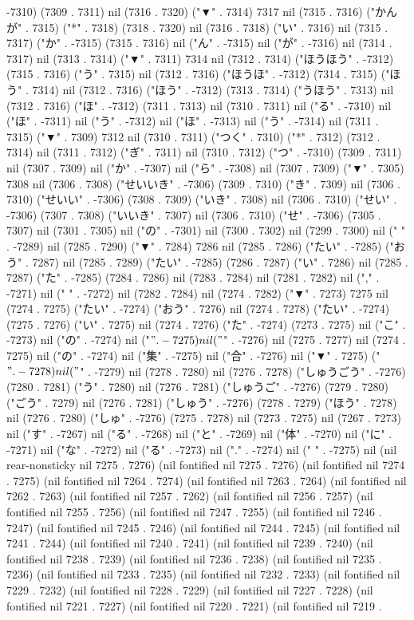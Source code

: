 -7310) (7309 . 7311) nil (7316 . 7320) ("▼" . 7314) 7317 nil (7315 . 7316) ("かんが" . 7315) ("*" . 7318) (7318 . 7320) nil (7316 . 7318) ("い" . 7316) nil (7315 . 7317) ("か" . -7315) (7315 . 7316) nil ("ん" . -7315) nil ("が" . -7316) nil (7314 . 7317) nil (7313 . 7314) ("▼" . 7311) 7314 nil (7312 . 7314) ("ほうほう" . -7312) (7315 . 7316) ("う" . 7315) nil (7312 . 7316) ("ほうほ" . -7312) (7314 . 7315) ("ほう" . 7314) nil (7312 . 7316) ("ほう" . -7312) (7313 . 7314) ("うほう" . 7313) nil (7312 . 7316) ("ほ" . -7312) (7311 . 7313) nil (7310 . 7311) nil ("る" . -7310) nil ("ほ" . -7311) nil ("う" . -7312) nil ("ほ" . -7313) nil ("う" . -7314) nil (7311 . 7315) ("▼" . 7309) 7312 nil (7310 . 7311) ("つく" . 7310) ("*" . 7312) (7312 . 7314) nil (7311 . 7312) ("ぎ" . 7311) nil (7310 . 7312) ("つ" . -7310) (7309 . 7311) nil (7307 . 7309) nil ("か" . -7307) nil ("ら" . -7308) nil (7307 . 7309) ("▼" . 7305) 7308 nil (7306 . 7308) ("せいいき" . -7306) (7309 . 7310) ("き" . 7309) nil (7306 . 7310) ("せいい" . -7306) (7308 . 7309) ("いき" . 7308) nil (7306 . 7310) ("せい" . -7306) (7307 . 7308) ("いいき" . 7307) nil (7306 . 7310) ("せ" . -7306) (7305 . 7307) nil (7301 . 7305) nil ("の" . -7301) nil (7300 . 7302) nil (7299 . 7300) nil (" " . -7289) nil (7285 . 7290) ("▼" . 7284) 7286 nil (7285 . 7286) ("たい" . -7285) ("おう" . 7287) nil (7285 . 7289) ("たい" . -7285) (7286 . 7287) ("い" . 7286) nil (7285 . 7287) ("た" . -7285) (7284 . 7286) nil (7283 . 7284) nil (7281 . 7282) nil ("," . -7271) nil (" " . -7272) nil (7282 . 7284) nil (7274 . 7282) ("▼" . 7273) 7275 nil (7274 . 7275) ("たい" . -7274) ("おう" . 7276) nil (7274 . 7278) ("たい" . -7274) (7275 . 7276) ("い" . 7275) nil (7274 . 7276) ("た" . -7274) (7273 . 7275) nil ("こ" . -7273) nil ("の" . -7274) nil ("$" . -7275) nil ("$" . -7276) nil (7275 . 7277) nil (7274 . 7275) nil ("の" . -7274) nil ("集" . -7275) nil ("合" . -7276) nil ("▼" . 7275) ("$" . -7278) nil ("$" . -7279) nil (7278 . 7280) nil (7276 . 7278) ("しゅうごう" . -7276) (7280 . 7281) ("う" . 7280) nil (7276 . 7281) ("しゅうご" . -7276) (7279 . 7280) ("ごう" . 7279) nil (7276 . 7281) ("しゅう" . -7276) (7278 . 7279) ("ほう" . 7278) nil (7276 . 7280) ("しゅ" . -7276) (7275 . 7278) nil (7273 . 7275) nil (7267 . 7273) nil ("す" . -7267) nil ("る" . -7268) nil ("と" . -7269) nil ("体" . -7270) nil ("に" . -7271) nil ("な" . -7272) nil ("る" . -7273) nil ("." . -7274) nil (" " . -7275) nil (nil rear-nonsticky nil 7275 . 7276) (nil fontified nil 7275 . 7276) (nil fontified nil 7274 . 7275) (nil fontified nil 7264 . 7274) (nil fontified nil 7263 . 7264) (nil fontified nil 7262 . 7263) (nil fontified nil 7257 . 7262) (nil fontified nil 7256 . 7257) (nil fontified nil 7255 . 7256) (nil fontified nil 7247 . 7255) (nil fontified nil 7246 . 7247) (nil fontified nil 7245 . 7246) (nil fontified nil 7244 . 7245) (nil fontified nil 7241 . 7244) (nil fontified nil 7240 . 7241) (nil fontified nil 7239 . 7240) (nil fontified nil 7238 . 7239) (nil fontified nil 7236 . 7238) (nil fontified nil 7235 . 7236) (nil fontified nil 7233 . 7235) (nil fontified nil 7232 . 7233) (nil fontified nil 7229 . 7232) (nil fontified nil 7228 . 7229) (nil fontified nil 7227 . 7228) (nil fontified nil 7221 . 7227) (nil fontified nil 7220 . 7221) (nil fontified nil 7219 . 